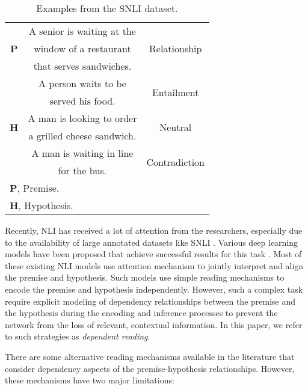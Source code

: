 \documentclass[11pt,a4paper]{article}
\begin{document}
	
	\begin{table}[t]
		\small
		\begin{center}
			\begin{tabular}{|c|c|c|}
				\hline 
				\multirow{3}{*}{\textbf{P}} & A senior is waiting at the & \multirow{3}{*}{Relationship} \\
				& window of a restaurant &  \\
				& that serves sandwiches. &  \\ \hline
				\multirow{6}{*}{\textbf{H}} & A person waits to be   & \multirow{2}{*}{Entailment} \\
				& served his food. &  \\ \cline{2-3}
				& A man is looking to order & \multirow{2}{*}{Neutral} \\ 
				& a grilled cheese sandwich. & \\ \cline{2-3}
				& A man is waiting in line & \multirow{2}{*}{Contradiction} \\
				& for the bus. &  \\ \hline
				\multicolumn{3}{|l|}{\textbf{P}, Premise.}\\
				\multicolumn{3}{|l|}{\textbf{H}, Hypothesis.}\\ \hline
			\end{tabular}
		\end{center}
		\caption{\label{tab:sample} Examples from the SNLI dataset.}
	\end{table}
	
	
	Recently, NLI has received a lot of attention from the researchers, especially due to the availability of large annotated datasets like SNLI \cite{snli}. Various deep learning models have been proposed that achieve successful results for this task \cite{gong2017,ibm2017,him2017,nse2017,google2016, kai_2016,re-read}. Most of these existing NLI models use attention mechanism to jointly interpret and align the premise and hypothesis. Such models use simple reading mechanisms to encode the premise and hypothesis independently. However, such a complex task require explicit modeling of dependency relationships between the premise and the hypothesis during the encoding and inference processes to prevent the network from the loss of relevant, contextual information. In this paper, we refer to such strategies as \emph{dependent reading}. 
	
	There are some alternative reading mechanisms available in the literature \cite{re-read,Rocktaschel2015} that consider dependency aspects of the premise-hypothesis relationships. However, these mechanisms have two major limitations:
	
\end{document}
